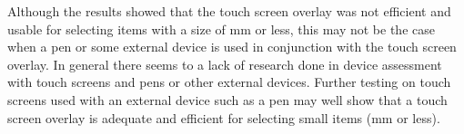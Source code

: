\documentclass{elsart}
\begin{document}
Although the results showed that the touch screen overlay was not
efficient and usable for selecting items with a size of \unit[4]{mm} or
less, this may not be the case when a pen or some external device is
used in conjunction with the touch screen overlay. In general there
seems to a lack of research done in device assessment with touch screens
and pens or other external devices. Further testing on touch screens
used with an external device such as a pen may well show that a touch
screen overlay is adequate and efficient for selecting small items
(\unit[4]{mm} or less).









% 
\end{document}
